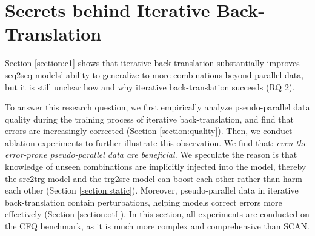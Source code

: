 \documentclass[letterpaper]{article} %
\begin{document}
\section{Secrets behind Iterative Back-Translation}
\label{section:c2}

Section \ref{section:c1} shows that iterative back-translation substantially improves seq2seq models' ability to generalize to more combinations beyond parallel data, but it is still unclear how and why iterative back-translation succeeds (RQ 2).

To answer this research question, we first empirically analyze pseudo-parallel data quality during the training process of iterative back-translation, and find that errors are increasingly corrected (Section \ref{section:quality}).
Then, we conduct ablation experiments to further illustrate this observation.
We find that:
\emph{even the error-prone pseudo-parallel data are beneficial.}
We speculate the reason is that knowledge of unseen combinations are implicitly injected into the model, thereby the src2trg model and the trg2src model can boost each other rather than harm each other (Section \ref{section:static}).
Moreover, pseudo-parallel data in iterative back-translation contain perturbations, helping models correct errors more effectively (Section \ref{section:otf}).
In this section, all experiments are conducted on the CFQ benchmark, as it is much more complex and comprehensive than SCAN.
\end{document}
